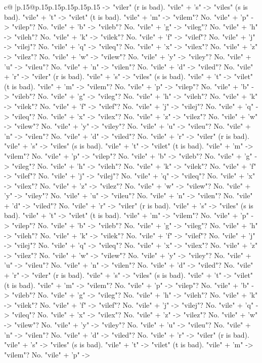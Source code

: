 \documentclass{article}
\begin{document}
{\begin{supertabular}{c@{$\;$}|p{.15\linewidth}@{}p{.15\linewidth}p{.15\linewidth}p{.15\linewidth}p{.15\linewidth}p{.15\linewidth}}
{{{{-}> "viler" (r is bad). "vile" + 's" {-}> "viles" (s is bad). "vile" + 't" {-}> "vilet" (t is bad). "vile" + 'm" {-}> "vilem"? No. "vile" + 'p" {-}> "vilep"? No. "vile" + 'b" {-}> "vileb"? No. "vile" + 'g" {-}> "vileg"? No. "vile" + 'h" {-}> "vileh"? No. "vile" + 'k" {-}> "vilek"? No. "vile" + 'f" {-}> "vilef"? No. "vile" + 'j" {-}> "vilej"? No. "vile" + 'q" {-}> "vileq"? No. "vile" + 'x" {-}> "vilex"? No. "vile" + 'z" {-}> "vilez"? No. "vile" + 'w" {-}> "vilew"? No. "vile" + 'y" {-}> "viley"? No. "vile" + 'u" {-}> "vileu"? No. "vile" + 'n" {-}> "vilen"? No. "vile" + 'd" {-}> "viled"? No. "vile" + 'r" {-}> "viler" (r is bad). "vile" + 's" {-}> "viles" (s is bad). "vile" + 't" {-}> "vilet" (t is bad). "vile" + 'm" {-}> "vilem"? No. "vile" + 'p" {-}> "vilep"? No. "vile" + 'b" {-}> "vileb"? No. "vile" + 'g" {-}> "vileg"? No. "vile" + 'h" {-}> "vileh"? No. "vile" + 'k" {-}> "vilek"? No. "vile" + 'f" {-}> "vilef"? No. "vile" + 'j" {-}> "vilej"? No. "vile" + 'q" {-}> "vileq"? No. "vile" + 'x" {-}> "vilex"? No. "vile" + 'z" {-}> "vilez"? No. "vile" + 'w" {-}> "vilew"? No. "vile" + 'y" {-}> "viley"? No. "vile" + 'u" {-}> "vileu"? No. "vile" + 'n" {-}> "vilen"? No. "vile" + 'd" {-}> "viled"? No. "vile" + 'r" {-}> "viler" (r is bad). "vile" + 's" {-}> "viles" (s is bad). "vile" + 't" {-}> "vilet" (t is bad). "vile" + 'm" {-}> "vilem"? No. "vile" + 'p" {-}> "vilep"? No. "vile" + 'b" {-}> "vileb"? No. "vile" + 'g" {-}> "vileg"? No. "vile" + 'h" {-}> "vileh"? No. "vile" + 'k" {-}> "vilek"? No. "vile" + 'f" {-}> "vilef"? No. "vile" + 'j" {-}> "vilej"? No. "vile" + 'q" {-}> "vileq"? No. "vile" + 'x" {-}> "vilex"? No. "vile" + 'z" {-}> "vilez"? No. "vile" + 'w" {-}> "vilew"? No. "vile" + 'y" {-}> "viley"? No. "vile" + 'u" {-}> "vileu"? No. "vile" + 'n" {-}> "vilen"? No. "vile" + 'd" {-}> "viled"? No. "vile" + 'r" {-}> "viler" (r is bad). "vile" + 's" {-}> "viles" (s is bad). "vile" + 't" {-}> "vilet" (t is bad). "vile" + 'm" {-}> "vilem"? No. "vile" + 'p" {-}> "vilep"? No. "vile" + 'b" {-}> "vileb"? No. "vile" + 'g" {-}> "vileg"? No. "vile" + 'h" {-}> "vileh"? No. "vile" + 'k" {-}> "vilek"? No. "vile" + 'f" {-}> "vilef"? No. "vile" + 'j" {-}> "vilej"? No. "vile" + 'q" {-}> "vileq"? No. "vile" + 'x" {-}> "vilex"? No. "vile" + 'z" {-}> "vilez"? No. "vile" + 'w" {-}> "vilew"? No. "vile" + 'y" {-}> "viley"? No. "vile" + 'u" {-}> "vileu"? No. "vile" + 'n" {-}> "vilen"? No. "vile" + 'd" {-}> "viled"? No. "vile" + 'r" {-}> "viler" (r is bad). "vile" + 's" {-}> "viles" (s is bad). "vile" + 't" {-}> "vilet" (t is bad). "vile" + 'm" {-}> "vilem"? No. "vile" + 'p" {-}> "vilep"? No. "vile" + 'b" {-}> "vileb"? No. "vile" + 'g" {-}> "vileg"? No. "vile" + 'h" {-}> "vileh"? No. "vile" + 'k" {-}> "vilek"? No. "vile" + 'f" {-}> "vilef"? No. "vile" + 'j" {-}> "vilej"? No. "vile" + 'q" {-}> "vileq"? No. "vile" + 'x" {-}> "vilex"? No. "vile" + 'z" {-}> "vilez"? No. "vile" + 'w" {-}> "vilew"? No. "vile" + 'y" {-}> "viley"? No. "vile" + 'u" {-}> "vileu"? No. "vile" + 'n" {-}> "vilen"? No. "vile" + 'd" {-}> "viled"? No. "vile" + 'r" {-}> "viler" (r is bad). "vile" + 's" {-}> "viles" (s is bad). "vile" + 't" {-}> "vilet" (t is bad). "vile" + 'm" {-}> "vilem"? No. "vile" + 'p" {-}> }}}
\end{supertabular}}
\end{document}
